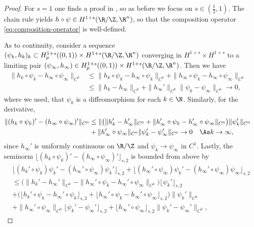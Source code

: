 \begin{proof}
For $s=1$ one finds a proof in \cite[Theorem 1.18]{reiter_2009}, so
as before we focus on $s\in (\frac{1}{2},1)$. The chain rule \cite[Lemma A.4]{knappmann-etal_2023} yields $h\circ\psi\in H^{1+s}(\R/\Z,\R^n)$, so that the composition operator \cref{eq:composition-operator}
is well-defined.

As to continuity, 
consider a sequence $(\psi_k,h_k)_k\subset H_p^{1+s}((0,1))
\times H^{1+s}(\R/\Z,\R^n)$ converging in $H^{1+s}\times H^{1+s}$ to a limiting 
pair $(\psi_\infty,h_\infty)\in H_p^{1+s}((0,1))\times H^{1+s}(\R/\Z,\R^n)$.
Then we have 
\begin{align*}
\textstyle
\|h_k\circ\psi_k-h_\infty\circ\psi_\infty\|_{C^0}
&\textstyle
\le\|h_k\circ\psi_k-h_\infty\circ\psi_k\|_{C^0}
+\|h_\infty\circ\psi_k-h_\infty\circ\psi_\infty\|_{C^0}\\
&\le \|h_k-h_\infty\|_{C^0}+\|h_\infty'\|_{C^0}
\|\psi_k-\psi_\infty\|_{C^0}\to 0,
\end{align*}
where we used, that $\psi_k$ is a diffeomorphism for each $k\in\N$. 
Similarly, for the  derivative,
\begin{align}
\|(h_k\circ\psi_k)'- (h_\infty\circ\psi_\infty)'\|_{C^0}&
\le\|\big(\|h_k'-h_\infty'\|_{C^0}
+\|h_\infty'\circ\psi_k-h_\infty'\circ\psi_\infty\|_{C^0} \big)\|\psi_k'\|_{C^0}
\notag\\
&+\|h_\infty'\circ\psi_\infty\|_{C^0}\|\psi_k'-\psi_\infty'\|_{C^0}\to 0\quad\As
k\to\infty,\label{eq:zwischen}
\end{align}
since
$h_\infty'$ is uniformly continuous on $\R/\Z$ and 
$\psi_k\to\psi_\infty$ in $C^1$. 
Lastly, 
the seminorm $\lfloor(h_k\circ\psi_k)'-(h_\infty\circ\psi_\infty)'\rfloor_{s,2}
$ is bounded from above by
\begin{align*}
&\lfloor(h_k'\circ\psi_k)\psi_k'-(h_\infty'\circ \psi_\infty)\psi_k'
\rfloor_{s,2}
+\lfloor(h_\infty'\circ\psi_\infty)\psi_k'-(h_\infty'\circ \psi_\infty)
\psi_\infty\rfloor_{s,2}\\
&\le
\big(\|h_k'-h_\infty'\|_{C^0}
-\|h_\infty'\circ\psi_k-h_\infty'\circ\psi_\infty\|_{C^0}\big)
\lfloor\psi_k'\rfloor_{s,2}\\
& + \big(
\lfloor h_k'\circ\psi_k-h_\infty'\circ\psi_k\rfloor_{s,2}+
\lfloor h_\infty'\circ\psi_k-h_\infty'\circ\psi_\infty\rfloor_{s,2}\big)
\|\psi_k'\|_{C^0}\\
& + \|h_\infty'\circ\psi_\infty\|_{C^0}\lfloor\psi_k'-\psi_\infty'\rfloor_{s,2}
+\lfloor h_\infty'\circ\psi_\infty\rfloor_{s,2}\|\psi_k'-\psi_\infty'\|_{C^0},

\end{align*}
\end{proof}
